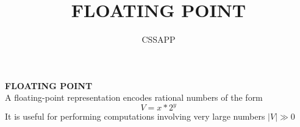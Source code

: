 \documentclass{article}
\title{FLOATING POINT}
\author{CSSAPP}
\begin{document}
    \maketitle

    \begin{flushleft}
    \textbf{FLOATING POINT}\\
    A floating-point representation encodes rational numbers of the form
    $$V = x \ast 2^y$$
    It is useful for performing computations involving very large numbers
    $|V| \gg 0$
    \end{flushleft}
\end{document}
